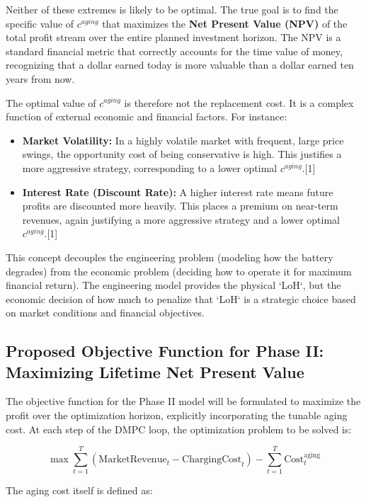 Neither of these extremes is likely to be optimal. The true goal is to find the specific value of $c^{aging}$ that maximizes the \textbf{Net Present Value (NPV)} of the total profit stream over the entire planned investment horizon. The NPV is a standard financial metric that correctly accounts for the time value of money, recognizing that a dollar earned today is more valuable than a dollar earned ten years from now.

The optimal value of $c^{aging}$ is therefore not the replacement cost. It is a complex function of external economic and financial factors. For instance:
\begin{itemize}
    \item \textbf{Market Volatility:} In a highly volatile market with frequent, large price swings, the opportunity cost of being conservative is high. This justifies a more aggressive strategy, corresponding to a lower optimal $c^{aging}$.[1]
    \item \textbf{Interest Rate (Discount Rate):} A higher interest rate means future profits are discounted more heavily. This places a premium on near-term revenues, again justifying a more aggressive strategy and a lower optimal $c^{aging}$.[1]
\end{itemize}

This concept decouples the engineering problem (modeling how the battery degrades) from the economic problem (deciding how to operate it for maximum financial return). The engineering model provides the physical `LoH`, but the economic decision of how much to penalize that `LoH` is a strategic choice based on market conditions and financial objectives.

\subsection{Proposed Objective Function for Phase II: Maximizing Lifetime Net Present Value}

The objective function for the Phase II model will be formulated to maximize the profit over the optimization horizon, explicitly incorporating the tunable aging cost. At each step of the DMPC loop, the optimization problem to be solved is:

\begin{equation}
\max \sum_{t=1}^{T} (\text{MarketRevenue}_t - \text{ChargingCost}_t) - \sum_{t=1}^{T} \text{Cost}_{t}^{\text{aging}}
\end{equation}

The aging cost itself is defined as:

